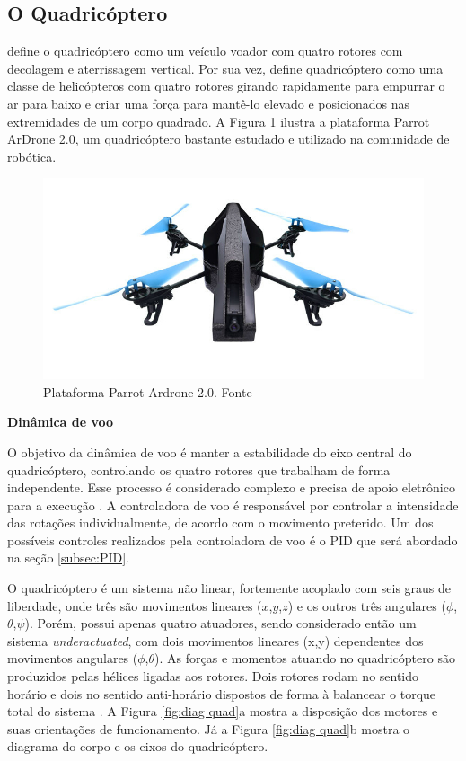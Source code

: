 \documentclass[a4paper, 12pt]{article}
\begin{document}
\subsection{O Quadricóptero}

\cite{Salih2010} define o quadricóptero como um veículo voador com quatro rotores com decolagem e aterrissagem vertical. Por sua vez, \cite{Gibiansky2010} define quadricóptero como uma classe de helicópteros com quatro rotores girando rapidamente para empurrar o ar para baixo e criar uma força para mantê-lo elevado e posicionados nas extremidades de um corpo quadrado. A Figura \ref{fig:quad} ilustra a plataforma Parrot ArDrone 2.0, um quadricóptero bastante estudado e utilizado na comunidade de robótica.

\begin{figure}[h]
	\centering
		\includegraphics[scale=0.4]{img/parrot_drone.jpg}
	\caption{Plataforma Parrot Ardrone 2.0. Fonte \cite{ardrone}}
	\label{fig:quad}
\end{figure}

\noindent\textbf{Dinâmica de voo}

O objetivo da dinâmica de voo é manter a estabilidade do eixo central do quadricóptero,  controlando os quatro rotores que trabalham de forma independente. Esse processo é considerado complexo e precisa de apoio eletrônico para a execução \cite{Gibiansky2010}. A controladora de voo é responsável por controlar a intensidade das rotações individualmente, de acordo com o movimento preterido. Um dos possíveis controles realizados pela controladora de voo é o PID que será abordado na seção \ref{subsec:PID}.

O quadricóptero é um sistema não linear, fortemente acoplado com seis graus de liberdade, onde três são movimentos lineares ($x$,$y$,$z$) e os outros três angulares ($\phi$,$\theta$,$\psi$). Porém, possui apenas quatro atuadores, sendo considerado então um sistema \textit{underactuated}, com dois movimentos lineares (x,y) dependentes dos movimentos angulares ($\phi$,$\theta$). As forças e momentos atuando no quadricóptero são produzidos pelas hélices ligadas aos rotores. Dois rotores rodam no sentido horário e dois no sentido anti-horário dispostos de forma à balancear o torque total do sistema \cite{Mian2008}. A Figura \ref{fig:diag quad}a mostra a disposição dos motores e suas orientações de funcionamento. Já a Figura \ref{fig:diag quad}b  mostra o diagrama do corpo e os eixos do quadricóptero.
\end{document}
